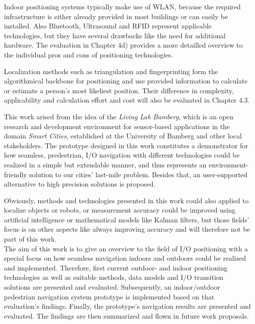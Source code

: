 Indoor positioning systems typically make use of WLAN, because the required infrastructure is either already provided in most buildings or can easily be installed. Also Bluetooth, Ultrasound and RFID represent applicable technologies, but they have several drawbacks like the need for additional hardware. The evaluation in Chapter 4d) provides a more detailled overview to the individual pros and cons of positioning technologies.

Localization methods such as triangulation and fingerprinting form the algorithmical backbone for positioning and use provided information to calculate or estimate a person's most likeliest position. Their difference in complexity, applicability and calculation effort and cost will also be evaluated in Chapter 4.3.

This work arised from the idea of the \textit{Living Lab Bamberg}, which is an open research and development environment for sensor-based applications in the domain \textit{Smart Cities}, established at the University of Bamberg and other local stakeholders.
The prototype designed in this work constitutes a demonstrator for how seamless, predestrian, I/O navigation with different technologies could be realized in a simple but extendable manner, and thus represents an environment-friendly solution to our cities' last-mile problem. Besides that, an user-supported alternative to high precision solutions is proposed.

Obviously, methods and technologies presented in this work could also applied to localize objects or robots, or measurement accuracy could be improved using artificial intelligence or mathematical models like Kalman filters, but those fields' focus is on other aspects like always improving accuracy and will therefore not be part of this work.\\

The aim of this work is to give an overview to the field of I/O positioning with a special focus on how seamless navigation indoors and outdoors could be realized and implemented. Therefore, first current outdoor- and indoor positioning technologies as well as suitable methods, data models and I/O transition solutions are presented and evaluated. Subsequently, an indoor/outdoor pedestrian navigation system prototype is implemented based on that evaluation's findings.
Finally, the prototype's navigation results are presented and evaluated. The findings are then summarized and flown in future work proposals.\\



